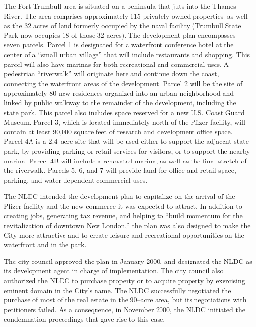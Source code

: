The Fort Trumbull area is situated on a peninsula that juts into the Thames
River. The area comprises approximately 115 privately owned properties, as well
as the 32 acres of land formerly occupied by the naval facility (Trumbull State
Park now occupies 18 of those 32 acres). The development plan encompasses seven
parcels. Parcel 1 is designated for a waterfront conference hotel at the center
of a ``small urban village'' that will include restaurants and shopping. This
parcel will also have marinas for both recreational and commercial uses. A
pedestrian ``riverwalk'' will originate here and continue down the coast,
connecting the waterfront areas of the development. Parcel 2 will be the site of
approximately 80 new residences organized into an urban neighborhood and linked
by public walkway to the remainder of the development, including the state park.
This parcel also includes space reserved for a new U.S. Coast Guard Museum.
Parcel 3, which is located immediately north of the Pfizer facility, will
contain at least 90,000 square feet of research and development office space.
Parcel 4A is a 2.4--acre site that will be used either to support the adjacent
state park, by providing parking or retail services for visitors, or to support
the nearby marina. Parcel 4B will include a renovated marina, as well as the
final stretch of the riverwalk. Parcels 5, 6, and 7 will provide land for office
and retail space, parking, and water-dependent commercial uses. 

The NLDC intended the development plan to capitalize on the arrival of the
Pfizer facility and the new commerce it was expected to attract. In addition to
creating jobs, generating tax revenue, and helping to ``build momentum for the
revitalization of downtown New London,'' the plan was also designed to make the
City more attractive and to create leisure and recreational opportunities on the
waterfront and in the park.

The city council approved the plan in January 2000, and designated the NLDC as
its development agent in charge of implementation. The city council also
authorized the NLDC to purchase property or to acquire property by exercising
eminent domain in the City's name. The NLDC successfully negotiated the purchase
of most of the real estate in the 90--acre area, but its negotiations with
petitioners failed. As a consequence, in November 2000, the NLDC initiated the
condemnation proceedings that gave rise to this case.



